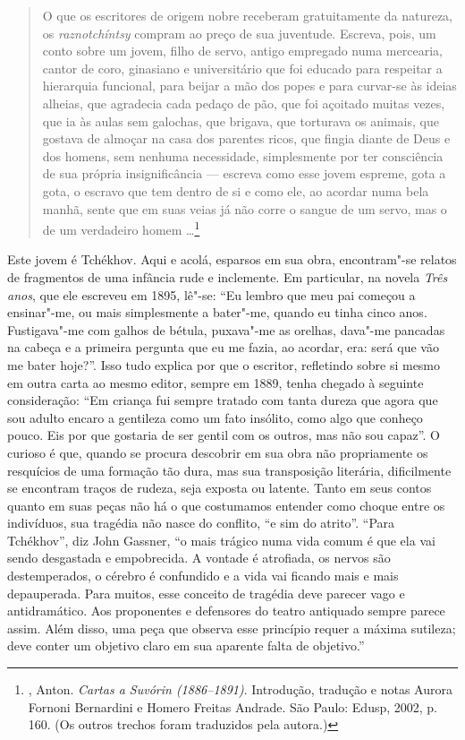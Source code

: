 \begin{quotation}
O que os escritores de origem nobre receberam gratuitamente da
natureza, os \emph{raznotchíntsy} compram ao preço de sua
juventude. Escreva, pois, um conto sobre um jovem, filho de
servo, antigo empregado numa mercearia, cantor de coro, ginasiano
e universitário que foi educado para respeitar a hierarquia
funcional, para beijar a mão dos popes e para curvar-se às
ideias alheias, que agradecia cada pedaço de pão, que foi açoitado
muitas vezes, que ia às aulas sem galochas, que brigava, que
torturava os animais, que gostava de almoçar na casa dos parentes
ricos, que fingia diante de Deus e dos homens, sem nenhuma
necessidade, simplesmente por ter consciência de sua própria
insignificância --- escreva como esse jovem espreme, gota a gota,
o escravo que tem dentro de si e como ele, ao acordar numa bela
manhã, sente que em suas veias já não corre o sangue de um servo,
mas o de um verdadeiro homem \ldots{}\footnote{,
Anton. \emph{Cartas a Suvórin (1886--1891)}. Introdução, tradução
e notas Aurora Fornoni Bernardini e Homero Freitas Andrade.
São Paulo: Edusp, 2002, p. 160. (Os outros trechos foram
traduzidos pela autora.)}
\end{quotation}

Este jovem é Tchékhov. Aqui e acolá, esparsos em sua obra,
encontram"-se relatos de fragmentos de uma infância rude e
inclemente. Em particular, na novela \emph{Três anos}, que
ele escreveu em 1895, lê"-se: ``Eu lembro que meu pai começou
a ensinar"-me, ou mais simplesmente a bater"-me, quando eu
tinha cinco anos. Fustigava"-me com galhos de bétula, puxava"-me
as orelhas, dava"-me pancadas na cabeça e a primeira pergunta que
eu me fazia, ao acordar, era: será que vão me bater hoje?''. Isso
tudo explica por que o escritor, refletindo sobre si mesmo em
outra carta ao mesmo editor, sempre em 1889, tenha chegado à
seguinte consideração: ``Em criança fui sempre tratado com
tanta dureza que agora que sou adulto encaro a gentileza como
um fato insólito, como algo que conheço pouco. Eis por que
gostaria de ser gentil com os outros, mas não sou capaz''.
O curioso é que, quando se procura descobrir em sua obra não
propriamente os resquícios de uma formação tão dura, mas sua
transposição literária, dificilmente se encontram traços de
rudeza, seja exposta ou latente. Tanto em seus contos quanto
em suas peças não há o que costumamos entender como choque
entre os indivíduos, sua tragédia não nasce do conflito, ``e sim
do atrito''. ``Para Tchékhov'', diz John Gassner, ``o mais
trágico numa vida comum é que ela vai sendo desgastada e
empobrecida. A vontade é atrofiada, os nervos são destemperados,
o cérebro é confundido e a vida vai ficando mais e mais
depauperada. Para muitos, esse conceito de tragédia deve parecer
vago e antidramático. Aos proponentes e defensores do teatro
antiquado sempre parece assim. Além disso, uma peça que observa
esse princípio requer a máxima sutileza; deve conter um objetivo
claro em sua aparente falta de objetivo.''

